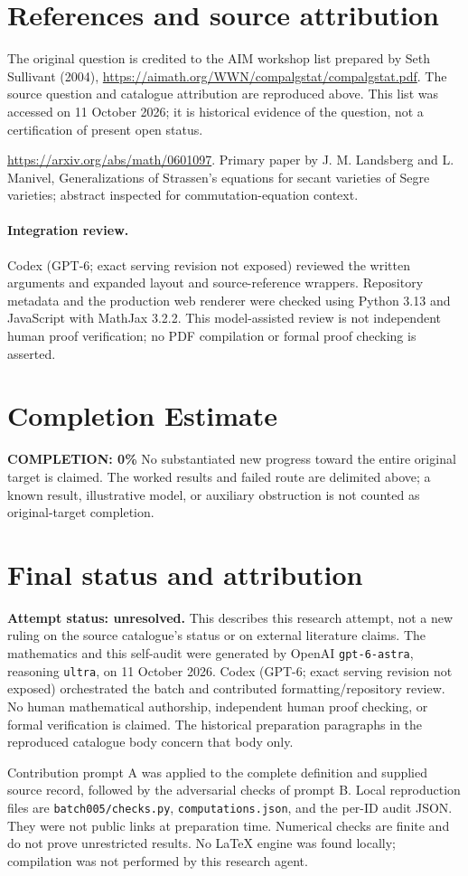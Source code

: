 \documentclass[11pt]{article}
\begin{document}
\section{References and source attribution}
The original question is credited to the AIM workshop list prepared by Seth Sullivant (2004), \url{https://aimath.org/WWN/compalgstat/compalgstat.pdf}. The source question and catalogue attribution are reproduced above. This list was accessed on 11 October 2026; it is historical evidence of the question, not a certification of present open status.

\url{https://arxiv.org/abs/math/0601097}. Primary paper by J. M. Landsberg and L. Manivel, Generalizations of Strassen's equations for secant varieties of Segre varieties; abstract inspected for commutation-equation context.


\paragraph{Integration review.} Codex (GPT-6; exact serving revision not exposed) reviewed the written arguments and expanded layout and source-reference wrappers. Repository metadata and the production web renderer were checked using Python 3.13 and JavaScript with MathJax 3.2.2. This model-assisted review is not independent human proof verification; no PDF compilation or formal proof checking is asserted.

\section{Completion Estimate}
\noindent\textbf{COMPLETION: 0\%}
No substantiated new progress toward the entire original target is claimed. The worked results and failed route are delimited above; a known result, illustrative model, or auxiliary obstruction is not counted as original-target completion.

\section{Final status and attribution}
\textbf{Attempt status: unresolved.} This describes this research attempt, not a new ruling on the source catalogue's status or on external literature claims.
The mathematics and this self-audit were generated by OpenAI \texttt{gpt-6-astra}, reasoning \texttt{ultra}, on 11 October 2026. Codex (GPT-6; exact serving revision not exposed) orchestrated the batch and contributed formatting/repository review. No human mathematical authorship, independent human proof checking, or formal verification is claimed. The historical preparation paragraphs in the reproduced catalogue body concern that body only.

Contribution prompt A was applied to the complete definition and supplied source record, followed by the adversarial checks of prompt B. Local reproduction files are \texttt{batch005/checks.py}, \texttt{computations.json}, and the per-ID audit JSON. They were not public links at preparation time. Numerical checks are finite and do not prove unrestricted results. No LaTeX engine was found locally; compilation was not performed by this research agent.
\end{document}
